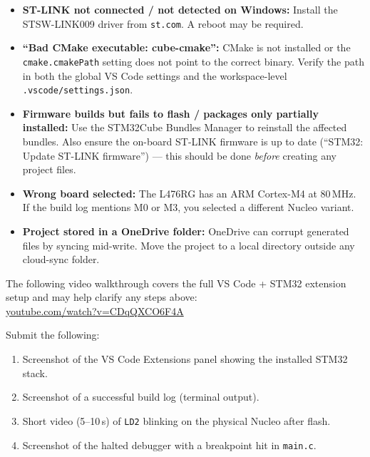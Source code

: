 \documentclass[11pt,letterpaper]{article}
\begin{document}
\begin{tcolorbox}[warning={Common Pitfalls}]
	\begin{itemize}[leftmargin=1.2em]
		\item \textbf{ST-LINK not connected / not detected on Windows:} Install the STSW-LINK009 driver from \texttt{st.com}. A reboot may be required.
		\item \textbf{``Bad CMake executable: cube-cmake'':} CMake is not installed or the \texttt{cmake.cmakePath} setting does not point to the correct binary. Verify the path in both the global VS Code settings and the workspace-level \texttt{.vscode/settings.json}.
		\item \textbf{Firmware builds but fails to flash / packages only partially installed:} Use the STM32Cube Bundles Manager to reinstall the affected bundles. Also ensure the on-board ST-LINK firmware is up to date (``STM32: Update ST-LINK firmware'') --- this should be done \emph{before} creating any project files.
		\item \textbf{Wrong board selected:} The L476RG has an ARM Cortex-M4 at 80\,MHz. If the build log mentions M0 or M3, you selected a different Nucleo variant.
		\item \textbf{Project stored in a OneDrive folder:} OneDrive can corrupt generated files by syncing mid-write. Move the project to a local directory outside any cloud-sync folder.
	\end{itemize}
\end{tcolorbox}

\begin{tcolorbox}[infobox={Additional Resource}]
	The following video walkthrough covers the full VS Code + STM32 extension setup and may help clarify any steps above:\\
	\href{https://www.youtube.com/watch?v=CDqQXCO6F4A}{youtube.com/watch?v=CDqQXCO6F4A}
\end{tcolorbox}

\begin{tcolorbox}[deliverable={Lab Handout 1-B Deliverable}]
	Submit the following:
	\begin{enumerate}[leftmargin=1.2em]
		\item Screenshot of the VS Code Extensions panel showing the installed STM32 stack.
		\item Screenshot of a successful build log (terminal output).
		\item Short video (5--10\,s) of \texttt{LD2} blinking on the physical Nucleo after flash.
		\item Screenshot of the halted debugger with a breakpoint hit in \texttt{main.c}.
	\end{enumerate}
\end{tcolorbox}

\printhandoutglossary
\end{document}
